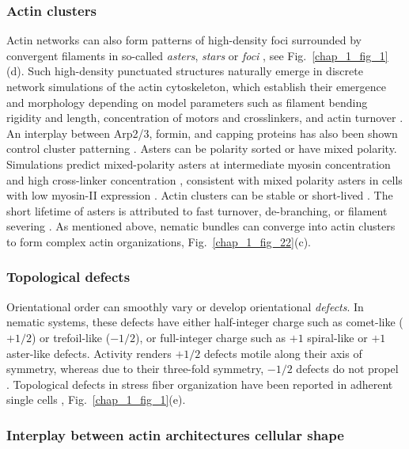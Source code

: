 \subsubsection{Actin clusters}

Actin networks can also form patterns of high-density foci surrounded by convergent filaments in so-called \emph{asters}, \emph{stars} or \emph{foci} \cite{nishikawa2017,xia2019,fritzsche2017}, see Fig.~\ref{chap_1_fig_1}(d). Such high-density punctuated structures naturally emerge in discrete network simulations of the actin cytoskeleton, which establish their emergence and morphology  depending on model parameters such as filament bending rigidity and length,  concentration of motors and crosslinkers, and actin turnover \cite{freedman2018,li2017,yu2018,mak2016, hiraiwa2016, miller2018}. An interplay between  Arp2/3, formin, and capping proteins has also been shown control cluster patterning \cite{xia2019}. Asters can be polarity sorted or have mixed polarity. Simulations predict mixed-polarity asters at intermediate myosin concentration and high cross-linker concentration \cite{freedman2018}, consistent with mixed polarity asters in cells with low myosin-II expression \cite{xia2019}. Actin clusters can be stable  or short-lived \cite{hiraiwa2016,mcfadden2017}. The short lifetime of asters is attributed to fast turnover, de-branching, or filament severing \cite{yu2018,li2017,mak2016}. As mentioned above, nematic bundles can converge into actin clusters to form complex actin organizations, Fig.~\ref{chap_1_fig_22}(c).

\subsubsection{Topological defects}

Orientational order can smoothly vary or develop orientational  \emph{defects}. In nematic systems, these defects have either half-integer charge such as comet-like ($+1/2$) or trefoil-like ($-1/2$), or full-integer charge such as $+1$ spiral-like or $+1$ aster-like defects.  Activity renders $+1/2$ defects motile along their axis of symmetry, whereas due to their three-fold symmetry,  $-1/2$ defects do not propel \cite{thijssen2020,vafa2020}. Topological defects in stress fiber organization have been reported in adherent single cells  \cite{schakenraad2020},  Fig.~\ref{chap_1_fig_1}(e).


\subsubsection{Interplay between actin architectures cellular shape}

